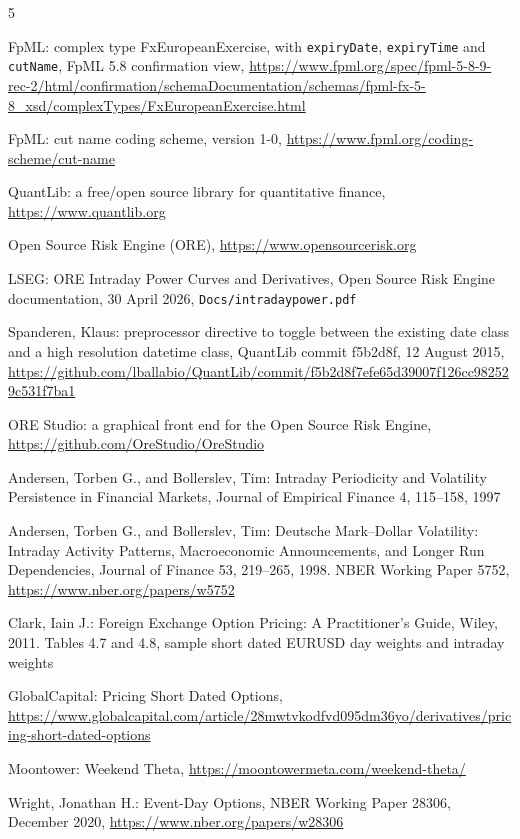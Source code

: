 \documentclass[12pt, a4paper]{article}
\begin{document}
\begin{thebibliography}{5}

 FpML: complex type FxEuropeanExercise, with \texttt{expiryDate}, \texttt{expiryTime} and
  \texttt{cutName}, FpML 5.8 confirmation view,
  \url{https://www.fpml.org/spec/fpml-5-8-9-rec-2/html/confirmation/schemaDocumentation/schemas/fpml-fx-5-8_xsd/complexTypes/FxEuropeanExercise.html}

 FpML: cut name coding scheme, version 1-0, \url{https://www.fpml.org/coding-scheme/cut-name}

 QuantLib: a free/open source library for quantitative finance, \url{https://www.quantlib.org}

 Open Source Risk Engine (ORE), \url{https://www.opensourcerisk.org}

 LSEG: ORE Intraday Power Curves and Derivatives, Open Source Risk Engine documentation,
  30 April 2026, \texttt{Docs/intradaypower.pdf}

 Spanderen, Klaus: preprocessor directive to toggle between the existing date class and a high
  resolution datetime class, QuantLib commit f5b2d8f, 12 August 2015,
  \url{https://github.com/lballabio/QuantLib/commit/f5b2d8f7efe65d39007f126cc982529c531f7ba1}

 ORE Studio: a graphical front end for the Open Source Risk Engine,
  \url{https://github.com/OreStudio/OreStudio}

 Andersen, Torben G., and Bollerslev, Tim: Intraday Periodicity and Volatility Persistence in
  Financial Markets, Journal of Empirical Finance 4, 115--158, 1997

 Andersen, Torben G., and Bollerslev, Tim: Deutsche Mark--Dollar Volatility: Intraday Activity
  Patterns, Macroeconomic Announcements, and Longer Run Dependencies, Journal of Finance 53, 219--265, 1998.
  NBER Working Paper 5752, \url{https://www.nber.org/papers/w5752}

 Clark, Iain J.: Foreign Exchange Option Pricing: A Practitioner's Guide, Wiley, 2011.
  Tables 4.7 and 4.8, sample short dated EURUSD day weights and intraday weights

 GlobalCapital: Pricing Short Dated Options,
  \url{https://www.globalcapital.com/article/28mwtvkodfvd095dm36yo/derivatives/pricing-short-dated-options}

 Moontower: Weekend Theta, \url{https://moontowermeta.com/weekend-theta/}

 Wright, Jonathan H.: Event-Day Options, NBER Working Paper 28306, December 2020,
  \url{https://www.nber.org/papers/w28306}

\end{thebibliography}
\end{document}
